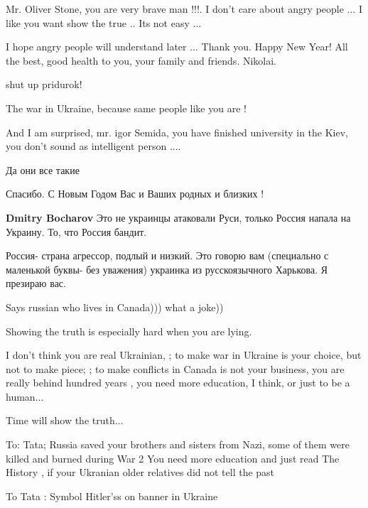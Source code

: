 \begin{itemize} %

Mr. Oliver Stone, you are very brave man !!!. I don't care about angry people
... I like you want show the true .. Its not easy ...

I hope angry people will understand later ... Thank you. Happy New Year! All
the best, good health to you, your family and friends. Nikolai.

\begin{itemize} %
shut up pridurok!

The war in Ukraine, because same people like you are !

And I am surprised, mr. igor Semida, you have finished university in the Kiev, you don't sound as intelligent person ....

Да они все такие

Спасибо. С Новым Годом Вас и Ваших родных и близких !

\textbf{Dmitry Bocharov}
Это не украинцы атаковали Руси, только Россия напала на Украину. То, что Россия бандит.


Россия- страна агрессор, подлый и низкий. Это говорю вам (специально с
маленькой буквы- без уважения) украинка из русскоязычного Харькова. Я презираю
вас.


Says russian who lives in Canada))) what a joke))

Showing the truth is especially hard when you are lying.


I don't think you are real Ukrainian, ; to make war in Ukraine is your choice,
but not to make piece; ; to make conflicts in Canada is not your business, you
are really behind hundred years , you need more education, I think, or just to
be a human...


Time will show the truth...

To: Tata;
Russia saved your brothers and sisters from Nazi, some of them were killed and burned during War 2
You need more education and just read
The History , if your Ukranian older relatives did not tell the past

To Tata : Symbol Hitler'ss on banner in Ukraine


\end{itemize}
\end{itemize}
